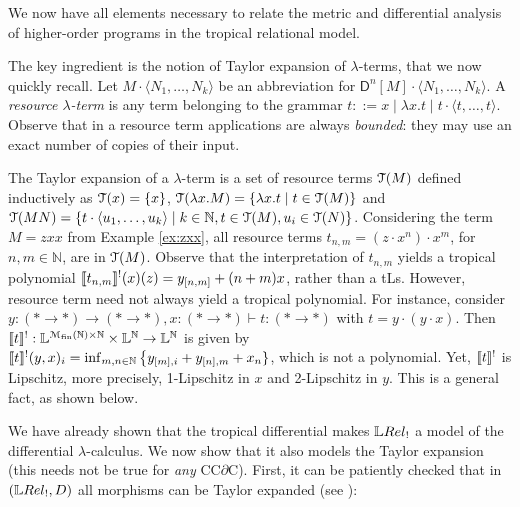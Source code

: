 

We now have all elements necessary to relate the metric and differential analysis of higher-order programs in the tropical relational model. 

The key ingredient is the notion of Taylor expansion of $\lambda$-terms, that we now quickly recall. 
Let $M\cdot \langle N_{1},\dots, N_{k}\rangle$ be an abbreviation for
$\mathsf D^{n}[M]\cdot \langle N_{1},\dots, N_{k}\rangle$. A \emph{resource $\lambda$-term} is any term belonging to the grammar $t::= x \mid \lambda x.t \mid t\cdot \langle t,\dots, t\rangle$.
Observe that in a resource term applications are always \emph{bounded}: they may use an exact number of copies of their input. 


The Taylor expansion of a $\lambda$-term is a set of resource terms $\mathcal{T}(M)$ defined inductively as $\mathcal{T}(x)=\{x\}$, $\mathcal{T}(\lambda x.M)=\{\lambda x.t\mid t\in \mathcal{T}(M)\}$ and 
$\mathcal{T}(MN)=\{ t\cdot \langle u_{1},\dots, u_{k}\rangle \mid k\in \mathbb N, t\in \mathcal{T}(M), u_{i}\in \mathcal{T}(N) \}$. 
Considering the term $M=zxx$ from Example \ref{ex:zxx}, all resource terms
 $t_{n,m}=(z\cdot x^{n})\cdot x^{m}$, for $n,m\in \mathbb N$, are in $\mathcal{T}(M)$. 
Observe that the interpretation of $t_{n,m}$ yields a tropical polynomial
$\llbracket t_{n,m}\rrbracket^{!}(x)(z)= y_{[n,m]}+(n+m)x$, rather than a tLs. 
However, resource term need not always yield a tropical polynomial. For instance, consider $y:(*\to*)\to (*\to*), x:(*\to *) \vdash t:  (*\to  *)$
with $t=y\cdot (y\cdot x)$. Then 
$\llbracket t\rrbracket^{!}: \mathbb{L}^{  \mathcal M_{\mathrm{fin}}(\mathbb N)\times \mathbb N}
\times \mathbb{L}^{\mathbb N} \to \mathbb{L}^{\mathbb N}$ is given by
$
\llbracket t\rrbracket^{!}(y,x)_{i}= \inf_{m,n\in \mathbb N}\big\{    y_{[m],i}  +  y_{[n],m}+  x_{n}\}
$, 
which is not a polynomial. Yet, $\llbracket t\rrbracket^{!}$ is Lipschitz, more precisely, 1-Lipschitz in $x$ and 2-Lipschitz in $y$. This is a general fact, as shown below.

%
We have already shown that the tropical differential makes $\LREL_{!}$ a model of the differential $\lambda$-calculus. We now show that it also models the Taylor expansion (this needs not be true for \emph{any} CC$\partial$C).
First, it can be patiently checked that in $(\LREL_!,D)$ all morphisms can be Taylor expanded  (see \cite[Definition 4.22]{Manzo2012}):

